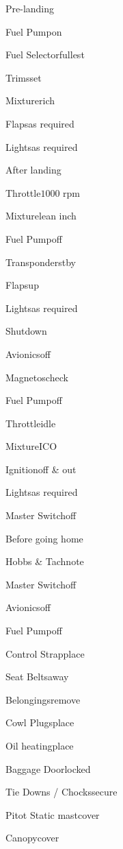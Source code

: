 \begin{multicols}{2}
\begin{checklist}{Pre-landing}
    \item{Fuel Pump}{on}
    \item{Fuel Selector}{fullest}
    \item{Trims}{set}
    \item{Mixture}{rich}
    \item{Flaps}{as required}
    \item{Lights}{as required}
\end{checklist}

\begin{checklist}{After landing}
    \item{Throttle}{$1000$ rpm}
    \item{Mixture}{lean  inch}
    \item{Fuel Pump}{off}
    \item{Transponder}{stby}
    \item{Flaps}{up}
    \item{Lights}{as required}
\end{checklist}

\begin{checklist}{Shutdown}
    \item{Avionics}{off}
    \item{Magnetos}{check}
    \item{Fuel Pump}{off}
    \item{Throttle}{idle}
    \item{Mixture}{ICO}
    \item{Ignition}{off \& out}
    \item{Lights}{as required}
    \item{Master Switch}{off}
\end{checklist}

\begin{checklist}{Before going home}
    \item{Hobbs \& Tach}{note}
    \item{Master Switch}{off}
    \item{Avionics}{off}
    \item{Fuel Pump}{off}
    \item{Control Strap}{place}
    \item{Seat Belts}{away}
    \item{Belongings}{remove}
    \item{Cowl Plugs}{place}
    \item{Oil heating}{place}
    \item{Baggage Door}{locked}
    \item{Tie Downs / Chocks}{secure}
    \item{Pitot Static mast}{cover}
    \item{Canopy}{cover}
\end{checklist}
\end{multicols}

